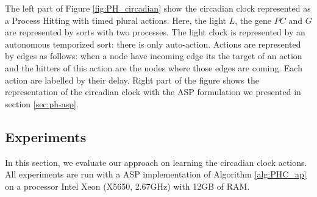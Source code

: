 The left part of Figure \ref{fig:PH_circadian} show the circadian clock represented as a Process Hitting with timed plural actions.
Here, the light $L$, the gene $PC$ and $G$ are represented by sorts with two processes.
The light clock is represented by an autonomous temporized sort: there is only auto-action.
Actions are represented by edges as follows: when a node have incoming edge its the target of an action and the hitters of this action are the nodes where those edges are coming.
Each action are labelled by their delay.
Right part of the figure shows the representation of the circadian clock with the ASP formulation we presented in section \ref{sec:ph-asp}.



\subsection{Experiments}

In this section, we evaluate our approach on learning the circadian clock actions.
All experiments are run with a ASP implementation of Algorithm \ref{alg:PHC_ap} on a processor Intel Xeon (X5650, 2.67GHz) with 12GB of RAM.

